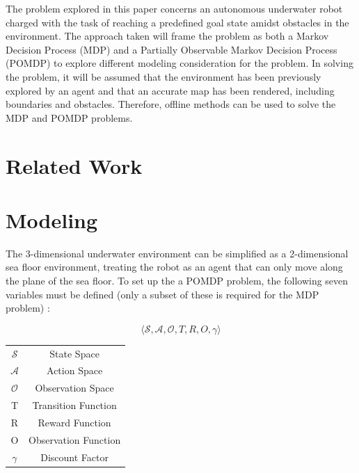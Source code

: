 \documentclass{article}
\begin{document}
The problem explored in this paper concerns an autonomous underwater robot charged with the task of reaching a predefined goal state amidst obstacles in the environment.  The approach taken will frame the problem as both a Markov Decision Process (MDP) and a Partially Observable Markov Decision Process (POMDP) to explore different modeling consideration for the problem.  In solving the problem, it will be assumed that the environment has been previously explored by an agent and that an accurate map has been rendered, including boundaries and obstacles.  Therefore, offline methods can be used to solve the MDP and POMDP problems.

\section*{Related Work}

\section*{Modeling}
The 3-dimensional underwater environment can be simplified as a 2-dimensional sea floor environment, treating the robot as an agent that can only move along the plane of the sea floor.  To set up the a POMDP problem, the following seven variables must be defined (only a subset of these is required for the MDP problem) \cite{POMDP Robert}:

\begin{equation}
\langle \mathcal{S}, \mathcal{A}, \mathcal{O}, T, R, O, \mathcal{\gamma} \rangle
\end{equation}

\begin{table}[h]
\centering
\begin{tabular}{c|c}

$\mathcal{S}$ & State Space \\ 
$\mathcal{A}$ & Action Space \\ 
$\mathcal{O}$ & Observation Space \\ 
T & Transition Function\\ 
R & Reward Function \\ 
O & Observation Function \\
$\mathcal{\gamma}$ & Discount Factor \\

\end{tabular}
\end{table}
\end{document}
